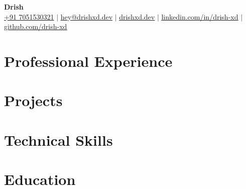 \documentclass[a4paper,11pt]{article}
\begin{document}
\begin{center}
    \textbf{\Huge Drish} \\ \vspace{1pt}
    \small
    \href{tel:+917051530321}{+91 7051530321}
    $|$
    \href{mailto:hey@drishxd.dev}{\ul{hey@drishxd.dev}}
    $|$
    \href{https://drishxd.dev}{\ul{drishxd.dev}}
    $|$
    \href{https://linkedin.com/in/drish-xd}{\ul{linkedin.com/in/drish-xd}}
    $|$
    \href{https://github.com/drish-xd}{\ul{github.com/drish-xd}}
\end{center}

\section{Professional Experience}
\sectionStart

\sectionEnd

\section{Projects}
\sectionStart

\sectionEnd

\section{Technical Skills}
\sectionStart
\li{
    
}
\sectionEnd

\section{Education}
\sectionStart

\vspace{2.5pt}
\sectionEnd
\end{document}

